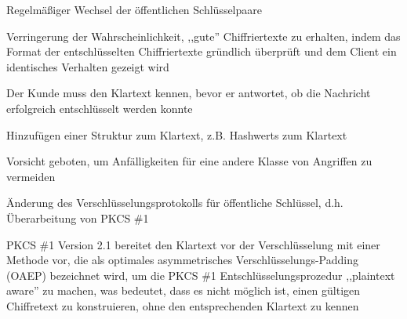 \documentclass[a4paper]{article}
\begin{document}
\begin{multicols}{3}
\begin{itemize*}
            \begin{itemize*}
                  \item Regelmäßiger Wechsel der öffentlichen Schlüsselpaare
                  \item Verringerung der Wahrscheinlichkeit, ,,gute'' Chiffriertexte zu erhalten, indem das Format der entschlüsselten Chiffriertexte gründlich überprüft und dem Client ein identisches Verhalten gezeigt wird
                  \item Der Kunde muss den Klartext kennen, bevor er antwortet, ob die Nachricht erfolgreich entschlüsselt werden konnte
                  \item Hinzufügen einer Struktur zum Klartext, z.B. Hashwerts zum Klartext
                  \item Vorsicht geboten, um Anfälligkeiten für eine andere Klasse von Angriffen zu vermeiden
                  \item Änderung des Verschlüsselungsprotokolls für öffentliche Schlüssel, d.h. Überarbeitung von PKCS \#1
                  \item PKCS \#1 Version 2.1 bereitet den Klartext vor der Verschlüsselung mit einer Methode vor, die als optimales asymmetrisches Verschlüsselungs-Padding (OAEP) bezeichnet wird, um die PKCS \#1 Entschlüsselungsprozedur ,,plaintext aware'' zu machen, was bedeutet, dass es nicht möglich ist, einen gültigen Chiffretext zu konstruieren, ohne den entsprechenden Klartext zu kennen
            \end{itemize*}
      \end{itemize*}


\end{multicols}
\end{document}
